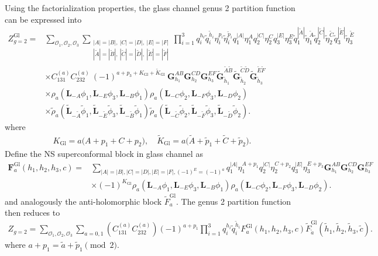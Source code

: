 \documentclass[12pt]{article}
\newcommand{\ie}{\begin{equation}\begin{aligned}}
\newcommand{\fe}{\end{aligned}\end{equation}}
\numberwithin{equation}{section}
\begin{document}
Using the factorialization properties, the glass channel genus 2 partition function can be expressed into
\[
\begin{aligned}
Z_{g=2}^{\mathrm{Gl}}
={}&
\sum_{\mathcal O_1,\mathcal O_2,\mathcal O_3}
\sum_{\substack{
|A|=|B|,\ |C|=|D|,\ |E|=|F|\\
|\widetilde A|=|\widetilde B|,\ 
|\widetilde C|=|\widetilde D|,\ 
|\widetilde E|=|\widetilde F|
}}
\prod_{i=1}^{3}
q_i^{h_i}\widetilde q_i^{\widetilde h_i} \eta_i^{p_i} \widetilde{\eta}_i^{\tilde{p}_i}
q_1^{|A|}\eta_1^A
q_2^{|C|}\eta_2^C
q_3^{|E|}\eta_3^E
\widetilde q_1^{|\widetilde A|}\widetilde\eta_1^{\widetilde A}
\widetilde q_2^{|\widetilde C|}\widetilde\eta_2^{\widetilde C}
\widetilde q_3^{|\widetilde E|}\widetilde\eta_3^{\widetilde E}
\\
&\times
C_{131}^{(a)}C_{232}^{(a)} ~(-1)^{a+p_3+K_{\mathrm{Gl}}+\widetilde K_{\mathrm{Gl}}}
~\mathbf G_{h_1}^{AB}
\mathbf G_{h_2}^{CD}
\mathbf G_{h_3}^{EF}
\widetilde{\mathbf G}_{\widetilde h_1}^{\widetilde A\widetilde B}
\widetilde{\mathbf G}_{\widetilde h_2}^{\widetilde C\widetilde D}
\widetilde{\mathbf G}_{\widetilde h_3}^{\widetilde E\widetilde F}
\\
&\times
\rho_a\!\left(
\mathbf L_{-A}\phi_1,
\mathbf L_{-E}\phi_3,
\mathbf L_{-B}\phi_1
\right)
\rho_a\!\left(
\mathbf L_{-C}\phi_2,
\mathbf L_{-F}\phi_3,
\mathbf L_{-D}\phi_2
\right)
\\
&\times
\widetilde\rho_a\!\left(
\widetilde{\mathbf L}_{-\widetilde A}\widetilde\phi_1,
\widetilde{\mathbf L}_{-\widetilde E}\widetilde\phi_3,
\widetilde{\mathbf L}_{-\widetilde B}\widetilde\phi_1
\right)
\widetilde\rho_a\!\left(
\widetilde{\mathbf L}_{-\widetilde C}\widetilde\phi_2,
\widetilde{\mathbf L}_{-\widetilde F}\widetilde\phi_3,
\widetilde{\mathbf L}_{-\widetilde D}\widetilde\phi_2
\right).
\end{aligned}
\]
where 
\ie
K_{\mathrm{Gl}}
=a\bigl(A+p_1+C+p_2\bigr),\quad
\widetilde K_{\mathrm{Gl}} =a\bigl(\widetilde A+\widetilde p_1
+\widetilde C+\widetilde p_2\bigr).
\fe
Define the NS superconformal block in glass channel as
\ie
 \label{NSblockGlassesDefinition}
\mathbf{F}^{\mathrm{Gl}}_a(h_1, h_2, h_3, c)= & \sum_{|A|=|B|,|C|=|D|,|E|=|F|, (-1)^{E}=(-1)^a} q_1^{|A|}\eta_1^{A+p_1} q_2^{|C|} \eta_2^{C+p_2} q_3^{|E|} \eta_3^{E+p_3} \mathbf{G}_{h_1}^{A B} \mathbf{G}_{h_2}^{C D} \mathbf{G}_{h_3}^{E F} \\
& \times (-1)^{K_{\mathrm{Gl}}}\rho_a(\mathbf{L}_{-A} \phi_1, \mathbf{L}_{-E} \phi_3, \mathbf{L}_{-B} \phi_1) \rho_a(\mathbf{L}_{-C} \phi_2, \mathbf{L}_{-F} \phi_3, \mathbf{L}_{-D} \phi_2).
\fe
and analogously the anti-holomorphic block $\widetilde{F}^{\mathrm{Gl}}_a$. The genus 2 partition function then reduces to
\ie
Z_{g=2} = \sum_{\mathcal{O}_1,\mathcal{O}_2,\mathcal{O}_3} \sum_{a=0,1}  \left(C^{(a)}_{131} C^{(a)}_{232}  \right) (-1)^{a+p_1} \prod_{i=1}^{3}
q_i^{h_i}\widetilde q_i^{\widetilde h_i} F^{\mathrm{Gl}}_a(h_1, h_2, h_3, c) \widetilde{F}^{\mathrm{Gl}}_{\tilde{a}} (\tilde{h}_1,\tilde{h}_2, \tilde{h}_3, \tilde{c}).
\fe
where $a+p_1= \tilde{a}+\tilde{p}_1 \pmod 2$.
\end{document}
